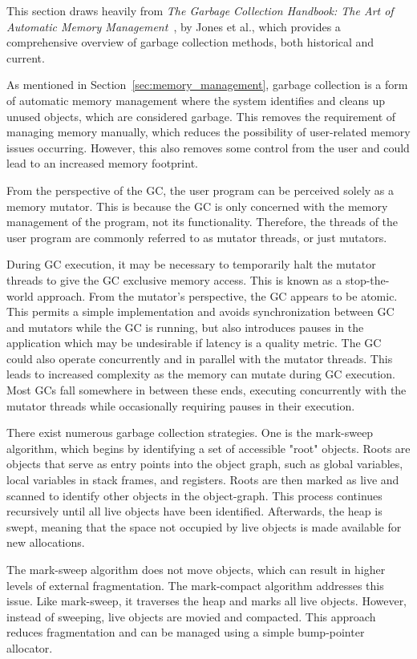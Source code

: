 
This section draws heavily from \textit{The Garbage Collection Handbook: The Art of Automatic Memory Management}~\cite{gchandbook}, by Jones et al., which provides a comprehensive overview of garbage collection methods, both historical and current.

As mentioned in Section~\ref{sec:memory_management}, garbage collection is a form of automatic memory management where the system identifies and cleans up unused objects, which are considered garbage. This removes the requirement of managing memory manually, which reduces the possibility of user-related memory issues occurring. However, this also removes some control from the user and could lead to an increased memory footprint.

From the perspective of the GC, the user program can be perceived solely as a memory mutator. This is because the GC is only concerned with the memory management of the program, not its functionality. Therefore, the threads of the user program are commonly referred to as mutator threads, or just mutators.

During GC execution, it may be necessary to temporarily halt the mutator threads to give the GC exclusive memory access. This is known as a stop-the-world approach. From the mutator's perspective, the GC appears to be atomic. This permits a simple implementation and avoids synchronization between GC and mutators while the GC is running, but also introduces pauses in the application which may be undesirable if latency is a quality metric. The GC could also operate concurrently and in parallel with the mutator threads. This leads to increased complexity as the memory can mutate during GC execution. Most GCs fall somewhere in between these ends, executing concurrently with the mutator threads while occasionally requiring pauses in their execution.

There exist numerous garbage collection strategies. One is the mark-sweep algorithm, which begins by identifying a set of accessible "root" objects. Roots are objects that serve as entry points into the object graph, such as global variables, local variables in stack frames, and registers. Roots are then marked as live and scanned to identify other objects in the object-graph. This process continues recursively until all live objects have been identified. Afterwards, the heap is swept, meaning that the space not occupied by live objects is made available for new allocations.

The mark-sweep algorithm does not move objects, which can result in higher levels of external fragmentation. The mark-compact algorithm addresses this issue. Like mark-sweep, it traverses the heap and marks all live objects. However, instead of sweeping, live objects are movied and compacted. This approach reduces fragmentation and can be managed using a simple bump-pointer allocator. 

